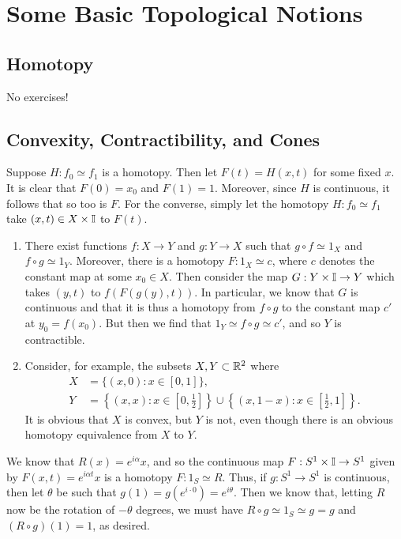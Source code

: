 \documentclass[../../solutions.tex]{subfiles}
\begin{document}
\section{Some Basic Topological Notions} 
\subsection{Homotopy} 
No exercises! 

\subsection{Convexity, Contractibility, and Cones} 
\begin{exercise} \leavevmode
Suppose $H:f_0\simeq f_1$ is a homotopy. Then let $F(t)=H(x,t)$ for some fixed $x$. It is clear that $F(0)=x_0$ and $F(1)=1$. Moreover, since $H$ is continuous, it follows that so too is $F$. For the converse, simply let the homotopy $H:f_0\simeq f_1$ take $(x,t)\in X\times\mathbb I$ to $F(t)$. 
\end{exercise} 

\begin{exercise} \leavevmode
\begin{enumerate}
\item There exist functions $f:X\to Y$ and $g:Y\to X$ such that $g\circ f\simeq1_X$ and $f\circ g\simeq1_Y$. Moreover, there is a homotopy $F:1_X\simeq c$, where $c$ denotes the constant map at some $x_0\in X$. Then consider the map $G:Y\times\mathbb I\to Y$ which takes $(y,t)$ to $f(F(g(y),t))$. In particular, we know that $G$ is continuous and that it is thus a homotopy from $f\circ g$ to the constant map $c'$ at $y_0=f(x_0)$. But then we find that $1_Y\simeq f\circ g\simeq c'$, and so $Y$ is contractible. 

\item Consider, for example, the subsets $X,Y\subset\mathbb{R}^2$ where \begin{align*}X&=\{(x,0):x\in[0,1]\},\\Y&=\left\{(x,x):x\in\left[0,\frac12\right]\right\}\cup\left\{(x,1-x):x\in\left[\frac12,1\right]\right\}.\end{align*} It is obvious that $X$ is convex, but $Y$ is not, even though there is an obvious homotopy equivalence from $X$ to $Y$. 
\end{enumerate}
\end{exercise} 

\begin{exercise} \leavevmode
We know that $R(x)=e^{i\alpha}x$, and so the continuous map $F:S^1\times\mathbb I\to S^1$ given by $F(x,t)=e^{i\alpha t}x$ is a homotopy $F:1_S\simeq R$. Thus, if $g:S^1\to S^1$ is continuous, then let $\theta$ be such that $g(1)=g(e^{i\cdot0})=e^{i\theta}$. Then we know that, letting $R$ now be the rotation of $-\theta$ degrees, we must have $R\circ g\simeq 1_S\simeq g=g$ and $(R\circ g)(1)=1$, as desired. 
\end{exercise} 
\end{document}
